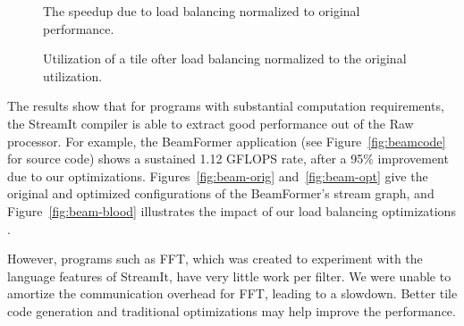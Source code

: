 \begin{figure}
\begin{minipage}{3.2in}
\centering
{}
\caption{The speedup due to load balancing normalized to original performance.
\protect\label{fig:opt-diagram}}
\end{minipage}
\hspace{0.1in}
\begin{minipage}{3.2in}
\centering
{}
\caption{Utilization of a tile ofter load balancing normalized to the original utilization.\protect\label{fig:utilization-diagram}}
\end{minipage}
\end{figure}

The results show that for programs with substantial computation
requirements, the StreamIt compiler is able to extract good
performance out of the Raw processor.  For example, the BeamFormer
application (see Figure~\ref{fig:beamcode} for source code) shows a
sustained 1.12 GFLOPS rate, after a 95\% improvement due to our
optimizations.  Figures~\ref{fig:beam-orig} and~\ref{fig:beam-opt}
give the original and optimized configurations of the BeamFormer's
stream graph, and Figure~\ref{fig:beam-blood} illustrates the impact
of our load balancing optimizations .

However, programs such as FFT, which was created to experiment with
the language features of StreamIt, have very little work per
filter. We were unable to amortize the communication overhead for FFT,
leading to a slowdown.  Better tile code generation and traditional
optimizations may help improve the performance.

